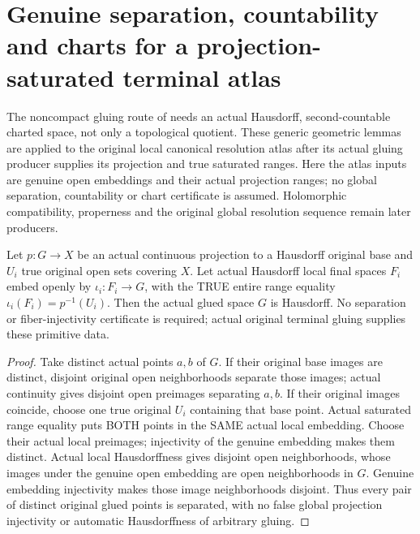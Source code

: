\section{Genuine separation, countability and charts for a projection-saturated terminal atlas}

The noncompact gluing route of
\cite{bierstone-milman08-functoriality,wlodarczyk05-hironaka} needs an
actual Hausdorff, second-countable charted space, not only a topological
quotient. These generic geometric lemmas are applied to the original local
canonical resolution atlas after its actual gluing producer supplies its
projection and true saturated ranges. Here the atlas inputs are genuine
open embeddings and their actual projection ranges; no global separation,
countability or chart certificate is assumed. Holomorphic compatibility,
properness and the original global resolution sequence remain later producers.

\begin{theorem}
\label{hir:terminal-atlas-actual-saturated-projection-hausdorff}
\leanok
{}
Let $p:G\to X$ be an actual continuous projection to a Hausdorff original
base and $U_i$ true original open sets covering $X$. Let actual Hausdorff
local final spaces $F_i$ embed openly by $\iota_i:F_i\to G$, with the
TRUE entire range equality $\iota_i(F_i)=p^{-1}(U_i)$. Then the actual
glued space $G$ is Hausdorff. No separation or fiber-injectivity certificate
is required; actual original terminal gluing supplies these primitive data.
\end{theorem}
\begin{proof}
Take distinct actual points $a,b$ of $G$. If their original base images are
distinct, disjoint original open neighborhoods separate those images;
actual continuity gives disjoint open preimages separating $a,b$. If their
original images coincide, choose one true original $U_i$ containing that
base point. Actual saturated range equality puts BOTH points in the SAME
actual local embedding. Choose their actual local preimages; injectivity
of the genuine embedding makes them distinct. Actual local Hausdorffness
gives disjoint open neighborhoods, whose images under the genuine open
embedding are open neighborhoods in $G$. Genuine embedding injectivity
makes those image neighborhoods disjoint. Thus every pair of distinct
original glued points is separated, with no false global projection
injectivity or automatic Hausdorffness of arbitrary gluing.
\end{proof}

